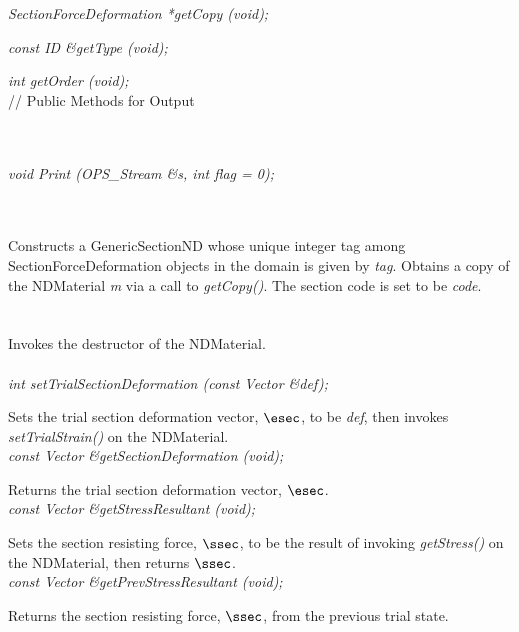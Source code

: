 {\em SectionForceDeformation *getCopy (void); } 

{\em const ID \&getType (void); } 

{\em int getOrder (void); } \\ 

// Public Methods for Output

\\
\\
{\em void Print (OPS_Stream \&s, int flag = 0);} 


  \\
  \\
Constructs a GenericSectionND whose unique integer tag among
SectionForceDeformation objects in the domain is given by {\em tag}. Obtains
a copy of the NDMaterial {\em m} via a call to {\em getCopy()}.
The section code is set to be {\em code}. \\

 \\
\\ 
Invokes the destructor of the NDMaterial. \\

 \\
{\em int setTrialSectionDeformation (const Vector \&def); }  

Sets the trial section deformation vector, $\esec$, to be {\em def}, then invokes
{\em setTrialStrain()} on the NDMaterial. \\

{\em const Vector \&getSectionDeformation (void); } 

Returns the trial section deformation vector, $\esec$. \\

{\em const Vector \&getStressResultant (void); } 

Sets the section resisting force, $\ssec$, to be the result of invoking 
{\em getStress()} on the NDMaterial, then returns $\ssec$. \\

{\em const Vector \&getPrevStressResultant (void); } 

Returns the section resisting force, $\ssec$, from the previous trial state. \\


